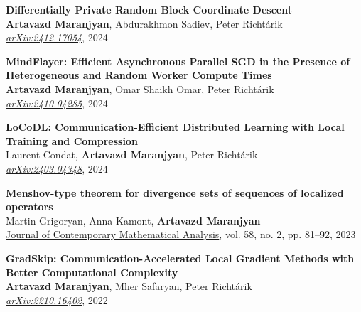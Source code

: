\documentclass[11pt,a4paper,sans]{moderncv}        %
\begin{document}
\begin{etaremune}

\item \textbf{Differentially Private Random Block Coordinate Descent}\\
\textbf{Artavazd Maranjyan}, Abdurakhmon Sadiev, Peter Richtárik\\
\textcolor{accent}{\href{https://arxiv.org/abs/2412.17054}{\textit{arXiv:2412.17054}}}, 2024
  
\vspace{2mm}

\item \textbf{MindFlayer: Efficient Asynchronous Parallel SGD in the Presence of Heterogeneous and Random Worker Compute Times}\\
\textbf{Artavazd Maranjyan}, Omar Shaikh Omar, Peter Richtárik\\
\textcolor{accent}{\href{https://arxiv.org/abs/2410.04285}{\textit{arXiv:2410.04285}}}, 2024
  
\vspace{2mm}

\item \textbf{LoCoDL: Communication-Efficient Distributed Learning with Local Training and Compression}\\
Laurent Condat, \textbf{Artavazd Maranjyan}, Peter Richtárik\\
\textcolor{accent}{\href{https://arxiv.org/abs/2403.04348}{\textit{arXiv:2403.04348}}}, 2024

\vspace{2mm}

\item \textbf{Menshov-type theorem for divergence sets of sequences of localized operators}\\
Martin Grigoryan, Anna Kamont, \textbf{Artavazd Maranjyan}\\
\href{https://doi.org/10.3103/S106836232302005X}{Journal of Contemporary Mathematical Analysis}, vol. 58, no. 2, pp. 81–92, 2023

\vspace{2mm}

\item \textbf{GradSkip: Communication-Accelerated Local Gradient Methods with Better Computational Complexity}\\
\textbf{Artavazd Maranjyan}, Mher Safaryan, Peter Richtárik\\
\textcolor{accent}{\href{https://arxiv.org/abs/2210.16402}{\textit{arXiv:2210.16402}}}, 2022


\end{etaremune}
\end{document}
